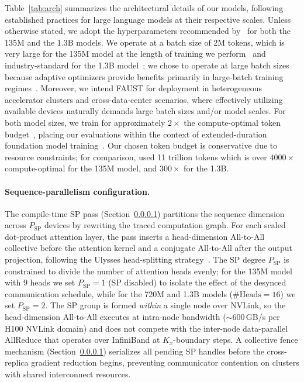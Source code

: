 \documentclass{article}
\begin{document}
Table~\ref{tab:arch} summarizes the architectural details of our models, following established practices for large
language models at their respective scales. Unless otherwise stated, we adopt the hyperparameters
recommended by~\citet{allal2025smollm2} for both the 135M and the 1.3B models. We operate at a
batch size of 2M tokens, which is very large for the 135M model at the length of training we
perform~\citep{merrill2025criticalbatchsizerevisited} and industry-standard for the 1.3B model~\citep{touvron2023llama2openfoundation};
we chose to operate at large batch sizes because adaptive optimizers provide benefits primarily in
large-batch training regimes~\citep{kunstner2023noisemainfactorgap}.
Moreover, we intend FAUST for deployment in heterogeneous accelerator clusters and
cross-data-center scenarios, where effectively utilizing available devices naturally demands large
batch sizes and/or model scales.
For both model sizes, we train for approximately $2\times$ the compute-optimal token
budget~\citep{hoffmann2022trainingcomputeoptimallargelanguage}, placing our evaluations within the context of extended-duration
foundation model training~\citep{allal2025smollm2}. Our chosen token budget is conservative due to
resource constraints; for comparison, \citet{allal2025smollm2} used 11 trillion tokens which is
over $4000\times$ compute-optimal for the 135M model, and $300\times$ for the 1.3B.

\paragraph{Sequence-parallelism configuration.}
\label{sec:neuronsp}
The compile-time SP pass (Section~\ref{sec:neuronsp}) partitions the sequence dimension across
$P_{\text{SP}}$ devices by rewriting the traced computation graph. For each scaled dot-product
attention layer, the pass inserts a head-dimension All-to-All collective before the attention
kernel and a conjugate All-to-All after the output projection, following the Ulysses
head-splitting strategy~\citep{jacobs2023deepspeedulyssesoptimizationsenabling,fang2024uspunifiedsequenceparallelism}.
The SP degree $P_{\text{SP}}$ is constrained to divide the number of attention heads evenly;
for the 135M model with 9 heads we set $P_{\text{SP}} = 1$ (SP disabled) to isolate the
effect of the desynced communication schedule, while for the 720M and 1.3B models
($\text{\#Heads} = 16$) we set $P_{\text{SP}} = 2$.
The SP group is formed \emph{within} a single node over NVLink, so the head-dimension
All-to-All executes at intra-node bandwidth (${\sim}600$\,GB/s per H100 NVLink domain)
and does not compete with the inter-node data-parallel AllReduce that operates over
InfiniBand at $K_x$-boundary steps.
A collective fence mechanism (Section~\ref{sec:neuronsp}) serializes all pending SP handles
before the cross-replica gradient reduction begins, preventing communicator contention on
clusters with shared interconnect resources.
\end{document}
